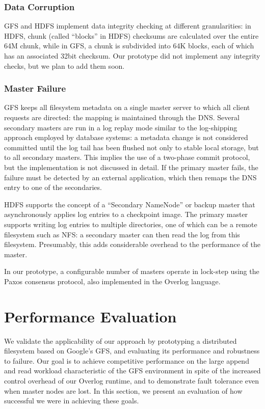 \documentclass{article}
\begin{document}
\subsubsection{Data Corruption}
GFS and HDFS implement data integrity checking at different
granularities: in HDFS, chunk (called ``blocks'' in HDFS) checksums
are calculated over the entire 64M chunk, while in GFS, a chunk is
subdivided into 64K blocks, each of which has an associated 32bit
checksum.  Our prototype did not implement any integrity checks, but
we plan to add them soon.

\subsubsection{Master Failure}
GFS keeps all filesystem metadata on a single master server to which
all client requests are directed: the mapping is maintained through
the DNS.  Several secondary masters are run in a log replay mode
similar to the log-shipping approach employed by database systems: a
metadata change is not considered committed until the log tail has
been flushed not only to stable local storage, but to all secondary
masters.  This implies the use of a two-phase commit protocol, but the
implementation is not discussed in detail.  If the primary master
fails, the failure must be detected by an external application, which
then remaps the DNS entry to one of the secondaries.
 
HDFS supports the concept of a ``Secondary NameNode'' or backup master
that asynchronously applies log entries to a checkpoint image.  The
primary master supports writing log entries to multiple directories,
one of which can be a remote filesystem such as NFS: a secondary
master can then read the log from this filesystem.  Presumably, this
adds considerable overhead to the performance of the master.
 
In our prototype, a configurable number of masters operate in
lock-step using the Paxos consensus protocol, also implemented in the
Overlog language.

\section{Performance Evaluation}
\label{perf-eval}
We validate the applicability of our approach by prototyping a
distributed filesystem based on Google's GFS, and evaluating its
performance and robustness to failure.  Our goal is to achieve
competitive performance on the large append and read workload
characteristic of the GFS environment in spite of the increased
control overhead of our Overlog runtime, and to demonstrate fault
tolerance even when master nodes are lost.  In this section, we
present an evaluation of how successful we were in achieving these
goals.
\end{document}
